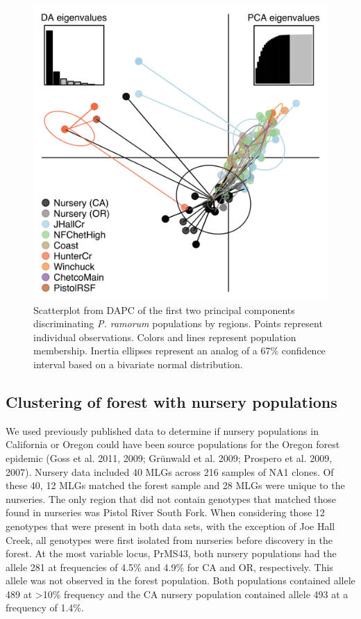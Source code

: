 \documentclass[double,12pt]{beavtex}
\begin{document}
  \begin{figure}
  
  {\centering \includegraphics[width=0.8\linewidth]{figure/phytopathology/figure_4} 
  
  }
  
  \caption[Scatterplot from DAPC of the first two principal components
  discriminating \emph{P. ramorum} populations by regions.]{Scatterplot from DAPC of the first two principal components
  discriminating \emph{P. ramorum} populations by regions. Points
  represent individual observations. Colors and lines represent population
  membership. Inertia ellipses represent an analog of a 67\% confidence
  interval based on a bivariate normal distribution.}\label{fig:ramorum4}
  \end{figure}
  
  \newpage
  
  \subsection{Clustering of forest with nursery
  populations}\label{clustering-of-forest-with-nursery-populations}
  
  We used previously published data to determine if nursery populations in
  California or Oregon could have been source populations for the Oregon
  forest epidemic (Goss et al. 2011, 2009; Grünwald et al. 2009; Prospero
  et al. 2009, 2007). Nursery data included 40 MLGs across 216 samples of
  NA1 clones. Of these 40, 12 MLGs matched the forest sample and 28 MLGs
  were unique to the nurseries. The only region that did not contain
  genotypes that matched those found in nurseries was Pistol River South
  Fork. When considering those 12 genotypes that were present in both data
  sets, with the exception of Joe Hall Creek, all genotypes were first
  isolated from nurseries before discovery in the forest. At the most
  variable locus, PrMS43, both nursery populations had the allele 281 at
  frequencies of 4.5\% and 4.9\% for CA and OR, respectively. This allele
  was not observed in the forest population. Both populations contained
  allele 489 at \textgreater{}10\% frequency and the CA nursery population
  contained allele 493 at a frequency of 1.4\%.
  
\end{document}
